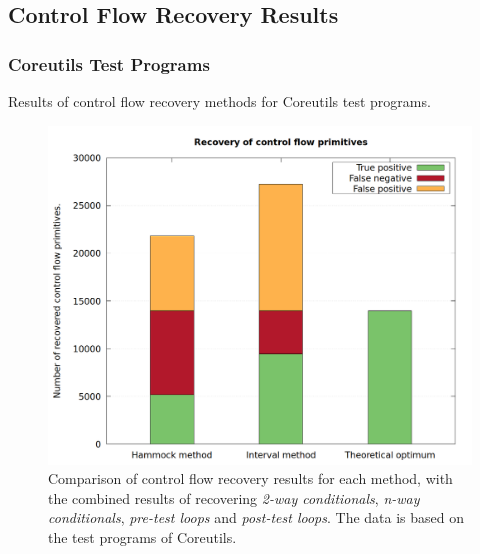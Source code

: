 
\subsection{Control Flow Recovery Results}
\label{app:control_flow_recovery_results}


\subsubsection{Coreutils Test Programs}
\label{app:coreutils_test_programs}

Results of control flow recovery methods for Coreutils test programs.

\begin{figure}[htbp]
	\centering
	\includegraphics[width=\textwidth]{inc/appendices/test_program_results/coreutils/results_combined.png}
	\caption{Comparison of control flow recovery results for each method, with the combined results of recovering \textit{2-way conditionals}, \textit{n-way conditionals}, \textit{pre-test loops} and \textit{post-test loops}. The data is based on the test programs of Coreutils.}
	\label{fig:coreutils_results_combined}
\end{figure}

